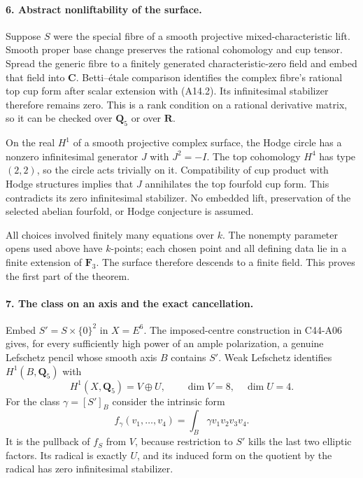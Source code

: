\documentclass[11pt]{article}
\theoremstyle{remark}\newtheorem{remark}[theorem]{Remark}
\begin{document}
\paragraph{6. Abstract nonliftability of the surface.}
Suppose $S$ were the special fibre of a smooth projective
mixed-characteristic lift. Smooth proper base change preserves
the rational cohomology and cup tensor. Spread the generic fibre
to a finitely generated characteristic-zero field and embed that
field into $\mathbf C$. Betti--\'etale comparison identifies
the complex fibre's rational top cup form after scalar extension
with (A14.2). Its infinitesimal stabilizer therefore remains
zero. This is a rank condition on a rational derivative matrix,
so it can be checked over $\mathbf Q_5$ or over $\mathbf R$.

On the real $H^1$ of a smooth projective complex surface, the
Hodge circle has a nonzero infinitesimal generator $J$ with
$J^2=-I$. The top cohomology $H^4$ has type $(2,2)$, so the
circle acts trivially on it. Compatibility of cup product with
Hodge structures implies that $J$ annihilates the top fourfold
cup form. This contradicts its zero infinitesimal stabilizer.
No embedded lift, preservation of the selected abelian
fourfold, or Hodge conjecture is assumed.

All choices involved finitely many equations over $k$.
The nonempty parameter opens used above have $k$-points; each
chosen point and all defining data lie in a finite extension of
$\mathbf F_3$. The surface therefore descends to a finite
field. This proves the first part of the theorem.

\paragraph{7. The class on an axis and the exact cancellation.}
Embed $S'=S\times\{0\}^2$ in $X=E^6$. The imposed-centre
construction in C44-A06 gives, for every sufficiently high
power of an ample polarization, a genuine Lefschetz pencil
whose smooth axis $B$ contains $S'$. Weak Lefschetz identifies
$H^1(B,\mathbf Q_5)$ with
\[
       H^1(X,\mathbf Q_5)=V\oplus U,\qquad\dim V=8,\quad\dim U=4.
\]
For the class $\gamma=[S']_B$ consider the intrinsic form
\[
 f_\gamma(v_1,\ldots,v_4)=\int_B\gamma v_1v_2v_3v_4.
                                                               \tag{A14.20}
\]
It is the pullback of $f_S$ from $V$, because restriction to
$S'$ kills the last two elliptic factors. Its radical is
exactly $U$, and its induced form on the quotient by the radical
has zero infinitesimal stabilizer.
\end{document}
